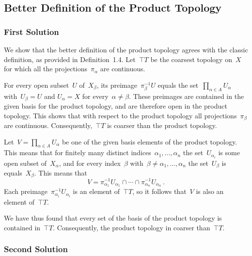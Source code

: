 \subsection{Better Definition of the Product Topology}



\subsubsection{First Solution}

We show that the better definition of the product topology agrees with the classic definition, as provided in Definition~1.4.
Let~$\top{T}$ be the coarsest topology on~$X$ for which all the projections~$π_α$ are continuous.

For every open subset~$U$ of~$X_β$, its preimage~$π_β^{-1} U$ equals the set~$∏_{α ∈ A} U_α$ with~$U_β = U$ and $U_α = X$ for every~$α ≠ β$.
These preimages are contained in the given basis for the product topology, and are therefore open in the product topology.
This shows that with respect to the product topology all projections~$π_β$ are continuous.
Consequently,~$\top{T}$ is coarser than the product topology.

Let~$V = ∏_{α ∈ A} U_α$ be one of the given basis elements of the product topology.
This means that for finitely many distinct indices~$α_1, \dotsc, α_n$ the set~$U_{α_i}$ is some open subset of~$X_α$, and for every index~$β$ with~$β ≠ α_1, \dotsc, α_n$ the set~$U_β$ is equals~$X_β$.
This means that
\[
	V = π_{α_1}^{-1} U_{α_1} ∩ \dotsb ∩ π_{α_n}^{-1} U_{α_n} \,.
\]
Each preimage~$π_{α_i}^{-1} U_{α_i}$ is an element of~$\top{T}$, so it follows that~$V$ is also an element of~$\top{T}$.

We have thus found that every set of the basis of the product topology is contained in~$\top{T}$.
Consequently, the product topology in coarser than~$\top{T}$.



\subsubsection{Second Solution}

